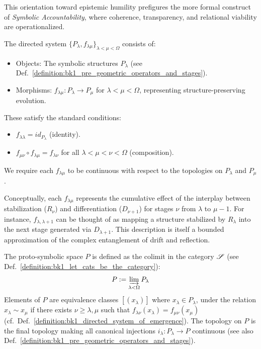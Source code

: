 \begin{remark}
    This orientation toward epistemic humility prefigures the more formal construct of \emph{Symbolic Accountability}, where coherence, transparency, and relational viability are operationalized.
\end{remark}
\begin{definition}
\label{definition:bk1_directed_system_of_emergence}
The directed system $\{P_\lambda, f_{\lambda\mu}\}_{\lambda < \mu < \Omega}$ consists of:
\begin{itemize}
    \item Objects: The symbolic structures $P_\lambda$ (see Def.~\ref{definition:bk1_pre_geometric_operators_and_stages}).
    \item Morphisms: $f_{\lambda\mu}: P_\lambda \to P_\mu$ for $\lambda < \mu < \Omega$, representing structure-preserving evolution.
\end{itemize}
These satisfy the standard conditions:
\begin{itemize}
    \item $f_{\lambda\lambda} = id_{P_\lambda}$ (identity).
    \item $f_{\mu\nu} \circ f_{\lambda\mu} = f_{\lambda\nu}$ for all $\lambda < \mu < \nu < \Omega$ (composition).
\end{itemize}
We require each $f_{\lambda\mu}$ to be continuous with respect to the topologies on $P_\lambda$ and $P_\mu$.

Conceptually, each $f_{\lambda\mu}$ represents the cumulative effect of the interplay between stabilization ($R_\nu$) and differentiation ($D_{\nu+1}$) for stages $\nu$ from $\lambda$ to $\mu-1$. For instance, $f_{\lambda, \lambda+1}$ can be thought of as mapping a structure stabilized by $R_\lambda$ into the next stage generated via $D_{\lambda+1}$. This description is itself a bounded approximation of the complex entanglement of drift and reflection.
\end{definition}
\begin{definition}
\label{definition:bk1_proto_symbolic_space}
The proto-symbolic space $P$ is defined as the colimit in the category $\mathscr{S}$ (see Def.~\ref{definition:bk1_let_cats_be_the_category}):
\[
P := \varinjlim_{\lambda < \Omega} P_\lambda
\]
Elements of $P$ are equivalence classes $[(x_\lambda)]$ where $x_\lambda \in P_\lambda$, under the relation $x_\lambda \sim x_\mu$ if there exists $\nu \geq \lambda, \mu$ such that $f_{\lambda\nu}(x_\lambda) = f_{\mu\nu}(x_\mu)$ (cf.~Def.~\ref{definition:bk1_directed_system_of_emergence}). The topology on $P$ is the final topology making all canonical injections $i_\lambda: P_\lambda \to P$ continuous (see also Def.~\ref{definition:bk1_pre_geometric_operators_and_stages}).
\end{definition}
